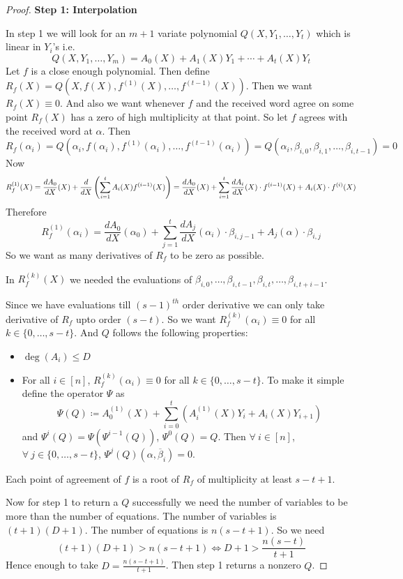 \begin{proof}
    \textbf{Step 1: Interpolation}


In step 1 we will look for an $m+1$ variate polynomial $Q(X,Y_1,\dots, Y_t)$ which is linear in $Y_i$'s i.e. $$Q(X,Y_1,\dots, Y_m)=A_0(X)+A_1(X)Y_1+\cdots +A_t(X)Y_t$$Let $f$ is a close enough polynomial. Then define $R_f(X)=Q(X,f(X), f^{(1)}(X),\dots, f^{(t-1)}(X))$.  Then we want $R_f(X)\equiv 0$. And also we want whenever $f$ and the received word agree on some point $R_f(X)$ has a zero of high multiplicity at that point. So let $f$ agrees with the received word at $\alpha$. Then $$R_f(\alpha_i)=Q(\alpha_i, f(\alpha_i), f^{(1)}(\alpha_i),\dots, f^{(t-1)}(\alpha_i))=Q(\alpha_i, \beta_{i,0},\beta_{i,1},\dots, \beta_{i,t-1})=0$$Now \begin{align*}
            R_f^{(1)}(X)=\frac{dA_0}{dX}(X)+\frac{d}{dX}\left(\sum\limits_{i=1}^tA_i(X)f^{(i-1)}(X)\right)=\frac{dA_0}{dX}(X)+\sum\limits_{i=1}^t\frac{dA_i}{dX}(X)\cdot f^{(i-1)}(X)+A_i(X)\cdot f^{(i)}(X)
        \end{align*}Therefore $$ R_f^{(1)}(\alpha_i)=\frac{dA_0}{dX}(\alpha_0)+\sum\limits_{j=1}^t\frac{dA_j}{dX}(\alpha_i)\cdot \beta_{i,j-1}+A_j(\alpha)\cdot \beta_{i,j}$$ So we want as many derivatives of $R_f$ to be zero as possible. \begin{observation}
In $R_f^{(k)}(X)$ we needed the evaluations of $\beta_{i,0},\dots, \beta_{i,t-1},\beta_{i,t},\dots, \beta_{i,t+i-1}$.
\end{observation}Since we have evaluations till $(s-1)^{th}$ order derivative we can only take derivative of $R_f$ upto order $(s-t)$. So we want $R_f^{(k)}(\alpha_i)\equiv 0$ for all $k\in\{0,\dots, s-t\}$. And $Q$ follows the following properties:
\begin{itemize}
    \item $\deg(A_i)\leq D$ 
    \item For all $i\in[n]$, $R_f^{(k)}(\alpha_i)\equiv 0$ for all $k\in\{0,\dots, s-t\}$. To make it simple define the operator $\Psi$ as $$\Psi(Q)\coloneqq A_0^{(1)}(X)+ \sum\limits_{i=0}^t(A_i^{(1)}(X)Y_i+A_i(X)Y_{i+1})$$ and $\Psi^i(Q)=\Psi(\Psi^{i-1}(Q))$, $\Psi^0(Q)=Q$. Then $\forall\ i\in[n]$, $\forall\ j\in\{0,\dots, s-t\}$, $\Psi^j(Q)(\alpha,\overline{\beta}_i)=0$.
\end{itemize}
\begin{observation}
    Each point of agreement of $f$ is a root of $R_f$ of multiplicity at least $s-t+1$.
\end{observation}
Now for step 1 to return a $Q$ successfully we need the number of variables to be more than the number of equations. The number of variables is $(t+1)(D+1)$. The number of equations is $n(s-t+1)$. So we need $$(t+1)(D+1)>n(s-t+1)\iff D+1>\frac{n(s-t)}{t+1}$$Hence enough to take $D=\frac{n(s-t+1)}{t+1}$. Then step 1 returns a nonzero $Q$. 


\end{proof}
